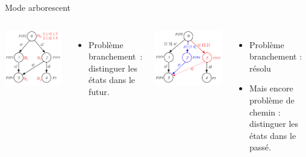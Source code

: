 \documentclass[compress]{beamer}
\begin{document}
\begin{frame}{Mode arborescent}%
\begin{columns}
	\centerline{\includegraphics[width=.8\linewidth]{graph_wd}}
	\begin{itemize}
	\item Problème branchement~:  distinguer les états dans le futur.
	\end{itemize}
	\centerline{\includegraphics[width=.8\linewidth]{graph_a}}
	\begin{itemize}
	\item Problème branchement : résolu
	\item Mais encore problème de chemin : distinguer les états dans le passé.
	\end{itemize}
\end{columns}
\end{frame}
\end{document}
